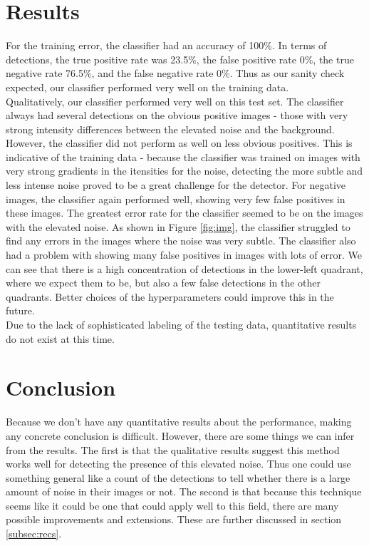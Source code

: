 \documentclass[twocolumn,longauthor]{aastex61}
\begin{document}
\newpage
\section{Results} \label{sec:results}
\noindent For the training error, the classifier had an accuracy of 100\%. In terms of detections, the true positive rate was 23.5\%, the false positive rate 0\%, the true negative rate 76.5\%, and the false negative rate 0\%. Thus as our sanity check expected, our classifier performed very well on the training data.\\
\indent Qualitatively, our classifier performed very well on this test set. The classifier always had several detections on the obvious positive images - those with very strong intensity differences between the elevated noise and the background. However, the classifier did not perform as well on less obvious positives. This is indicative of the training data - because the classifier was trained on images with very strong gradients in the itensities for the noise, detecting the more subtle and less intense noise proved to be a great challenge for the detector. For negative images, the classifier again performed well, showing very few false positives in these images. The greatest error rate for the classifier seemed to be on the images with the elevated noise. As shown in Figure \ref{fig:img}, the classifier struggled to find any errors in the images where the noise was very subtle. The classifier also had a problem with showing many false positives in images with lots of error. We can see that there is a high concentration of detections in the lower-left quadrant, where we expect them to be, but also a few false detections in the other quadrants. Better choices of the hyperparameters could improve this in the future.\\
\indent Due to the lack of sophisticated labeling of the testing data, quantitative results do not exist at this time.



\section{Conclusion} \label{sec:conclusion}
\noindent Because we don't have any quantitative results about the performance, making any concrete conclusion is difficult. However, there are some things we can infer from the results. The first is that the qualitative results suggest this method works well for detecting the presence of this elevated noise. Thus one could use something general like a count of the detections to tell whether there is a large amount of noise in their images or not. The second is that because this technique seems like it could be one that could apply well to this field, there are many possible improvements and extensions. These are further discussed in section \ref{subsec:recs}.
\end{document}
